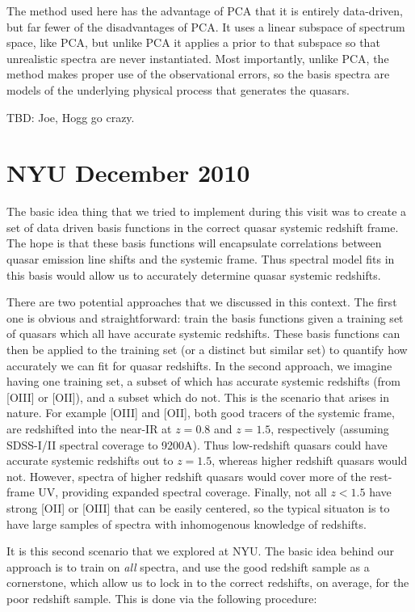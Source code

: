 \documentclass[apj]{emulateapj}
\begin{document}
The method used here has the advantage of PCA that it is entirely
data-driven, but far fewer of the disadvantages of PCA.  It uses a
linear subspace of spectrum space, like PCA, but unlike PCA it applies
a prior to that subspace so that unrealistic spectra are never
instantiated.  Most importantly, unlike PCA, the method makes proper
use of the observational errors, so the basis spectra are models of
the underlying physical process that generates the quasars.

TBD:  Joe, Hogg go crazy.

\section{NYU December 2010}

The basic idea thing that we tried to implement during this visit was to create
a set of data driven basis functions in the correct quasar systemic redshift
frame. The hope is that these basis functions will encapsulate correlations
between quasar emission line shifts and the systemic frame. Thus spectral 
model fits in this basis would allow us to accurately determine quasar
systemic redshifts. 

There are two potential approaches that we discussed in this
context. The first one is obvious and straightforward: train the basis
functions given a training set of quasars which all have accurate
systemic redshifts.  These basis functions can then be applied to the
training set (or a distinct but similar set) to quantify how
accurately we can fit for quasar redshifts. In the second approach, we
imagine having one training set, a subset of which has accurate
systemic redshifts (from [OIII] or [OII]), and a subset which do
not. This is the scenario that arises in nature. For example [OIII]
and [OII], both good tracers of the systemic frame, are redshifted into the
near-IR at $z = 0.8$ and $z = 1.5$, respectively (assuming SDSS-I/II
spectral coverage to 9200A). Thus low-redshift quasars could have
accurate systemic redshifts out to $z = 1.5$, whereas higher redshift
quasars would not. However, spectra of higher redshift quasars
would cover more of the rest-frame UV, providing expanded spectral
coverage. Finally, not all $ z < 1.5$ have strong [OII] or [OIII] that
can be easily centered, so the typical situaton is to have large samples
of spectra with inhomogenous knowledge of redshifts. 

It is this second scenario that we explored at NYU. The basic idea
behind our approach is to train on \emph{all} spectra, and use the 
good redshift sample as a cornerstone, which allow us to lock in 
to the correct redshifts, on average, for the poor redshift sample. This is 
done via the following procedure: 
\end{document}
